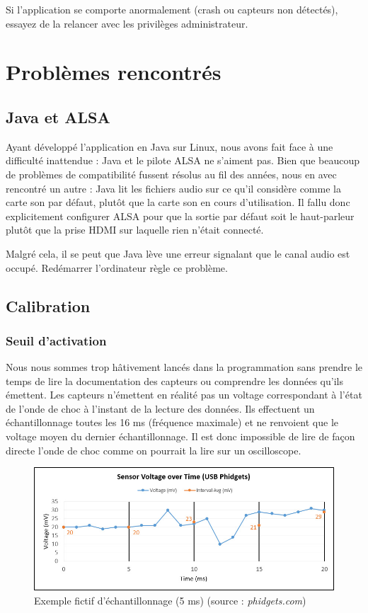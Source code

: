 \documentclass[11pt,a4paper,twoside,svgnames]{article}
\begin{document}
	Si l'application se comporte anormalement (crash ou capteurs non détectés), essayez de la relancer avec les privilèges administrateur.
	
	\section{Problèmes rencontrés}
	\subsection{Java et ALSA}
	Ayant développé l'application en Java sur Linux, nous avons fait face à une difficulté inattendue : Java et le pilote ALSA ne s'aiment pas. Bien que beaucoup de problèmes de compatibilité fussent résolus au fil des années, nous en avec rencontré un autre : Java lit les fichiers audio sur ce qu'il considère comme la carte son par défaut, plutôt que la carte son en cours d'utilisation. Il fallu donc explicitement configurer ALSA pour que la sortie par défaut soit le haut-parleur plutôt que la prise HDMI sur laquelle rien n'était connecté.
	
	Malgré cela, il se peut que Java lève une erreur signalant que le canal audio est occupé. Redémarrer l'ordinateur règle ce problème.
	
	\subsection{Calibration}
	\subsubsection{Seuil d'activation}
	Nous nous sommes trop hâtivement lancés dans la programmation sans prendre le temps de lire la documentation des capteurs ou comprendre les données qu'ils émettent. Les capteurs n'émettent en réalité pas un voltage correspondant à l'état de l'onde de choc à l'instant de la lecture des données. Ils effectuent un échantillonnage toutes les 16 ms (fréquence maximale) et ne renvoient que le voltage moyen du dernier échantillonnage. Il est donc impossible de lire de façon directe l'onde de choc comme on pourrait la lire sur un oscilloscope.
	
	\begin{figure}[h]
		\includegraphics[width=\linewidth]{IntervalchangeUSB.jpg}
		\caption{\label{intervalchange}Exemple fictif d'échantillonnage (5 ms) (source : \textit{phidgets.com})}
	\end{figure}
	
\end{document}
